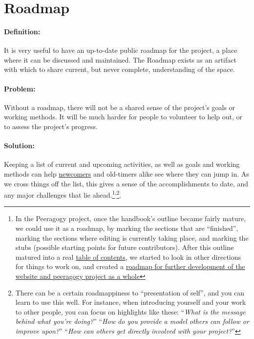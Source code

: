 \section{Roadmap}

\paragraph{Definition:} It is very useful to have an up-to-date public
roadmap for the project, a place where it can be discussed and
maintained. The Roadmap exists as an artifact with which to share
current, but never complete, understanding of the space.

\paragraph{Problem:} Without a roadmap, there will not be a shared sense of
the project's goals or working methods. It will be much harder for
people to volunteer to help out, or to assess the project's progress.

\paragraph{Solution:} Keeping a list of current and upcoming activities, as
well as goals and working methods can
help \href{http://peeragogy.org/practice/heuristics/newcomer/}{newcomers}
and old-timers alike see where they can jump in. As we cross things off
the list, this gives a sense of the accomplishments to date, and any
major challenges that lie ahead.\footnote{In the Peeragogy project, once the handbook's outline became fairly
  mature, we could use it as a roadmap, by marking the sections that are
  ``finished'', marking the sections where editing is currently taking
  place, and marking the stubs (possible starting points for future
  contributors). After this outline matured into a
  real \href{http://peeragogy.org/table-of-contents/}{table of contents},
  we started to look in other directions for things to work on, and
  created a \href{http://peeragogy.org/peeragogy-org-roadmap/}{roadmap
  for further development of the website and peeragogy project as a
  whole}}\textsuperscript{,}\footnote{There can be a certain roadmappiness to ``presentation of self'', and
  you can learn to use this well. For instance, when introducing
  yourself and your work to other people, you can focus on highlights
  like these: ``\emph{What is the message behind what you're doing?}''
    ``\emph{How do you provide a model others can follow or improve upon?}''
    ``\emph{How can others get directly involved with your project?}''}.

